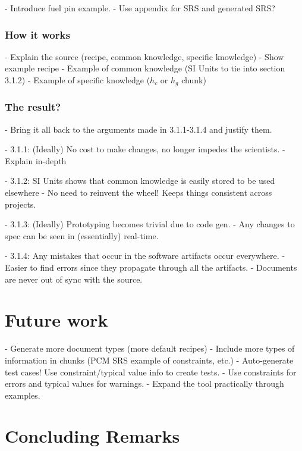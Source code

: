 \documentclass{sig-alternate-05-2015}
\begin{document}
- Introduce fuel pin example.
- Use appendix for SRS and generated SRS?

\subsubsection{How it works} \label{sssec:ex_how}
- Explain the source (recipe, common knowledge, specific knowledge)
- Show example recipe
- Example of common knowledge (SI Units to tie into section 3.1.2)
- Example of specific knowledge ($h_c$ or $h_g$ chunk)

\subsubsection{The result?} \label{sssec:ex_result}

- Bring it all back to the arguments made in 3.1.1-3.1.4 and justify them.

- 3.1.1: (Ideally) No cost to make changes, no longer impedes the scientists.
    - Explain in-depth

- 3.1.2: SI Units shows that common knowledge is easily stored to be used elsewhere
    - No need to reinvent the wheel! Keeps things consistent across projects.
    
- 3.1.3: (Ideally) Prototyping becomes trivial due to code gen.
    - Any changes to spec can be seen in (essentially) real-time.
    
- 3.1.4: Any mistakes that occur in the software artifacts occur everywhere.
    - Easier to find errors since they propagate through all the artifacts.
    - Documents are never out of sync with the source.

\section{Future work} \label{sec:todo}

- Generate more document types (more default recipes)
- Include more types of information in chunks (PCM SRS example of constraints, etc.)
  - Auto-generate test cases! Use constraint/typical value info to create tests.
  - Use constraints for errors and typical values for warnings.
- Expand the tool practically through examples.
    
\section{Concluding Remarks} \label{sec:conclusion}

\end{document}
